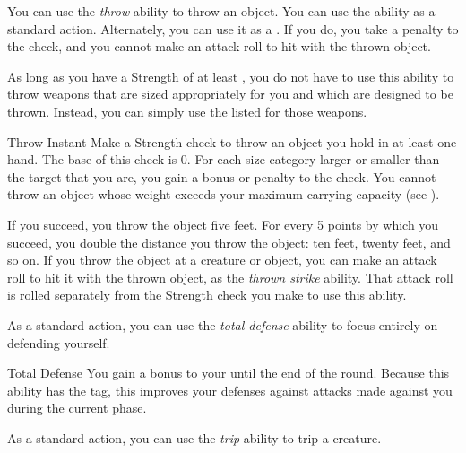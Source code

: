          You can use the \textit{throw} ability to throw an object.
        You can use the ability as a standard action.
        Alternately, you can use it as a .
        If you do, you take a  penalty to the check, and you cannot make an attack roll to hit with the thrown object.

        As long as you have a Strength of at least , you do not have to use this ability to throw weapons that are sized appropriately for you and which are designed to be thrown.
        Instead, you can simply use the listed  for those weapons.

        \begin{instantability}{Throw}
            \label{Throw}
            Instant
            \rankline
            Make a Strength check to throw an object you hold in at least one hand.
            The base  of this check is 0.
            For each size category larger or smaller than the target that you are, you gain a  bonus or penalty to the check.
            You cannot throw an object whose weight exceeds your maximum carrying capacity (see ).

            If you succeed, you throw the object five feet.
            For every 5 points by which you succeed, you double the distance you throw the object: ten feet, twenty feet, and so on.
            If you throw the object at a creature or object, you can make an attack roll to hit it with the thrown object, as the \textit{thrown strike} ability.
            That attack roll is rolled separately from the Strength check you make to use this ability.
        \end{instantability}

         As a standard action, you can use the \textit{total defense} ability to focus entirely on defending yourself.

        \begin{durationability}{Total Defense}
            \label{Total Defense}
            \rankline
            You gain a  bonus to your  until the end of the round.
            Because this ability has the  tag, this improves your defenses against attacks made against you during the current phase.
        \end{durationability}

         As a standard action, you can use the \textit{trip} ability to trip a creature.

